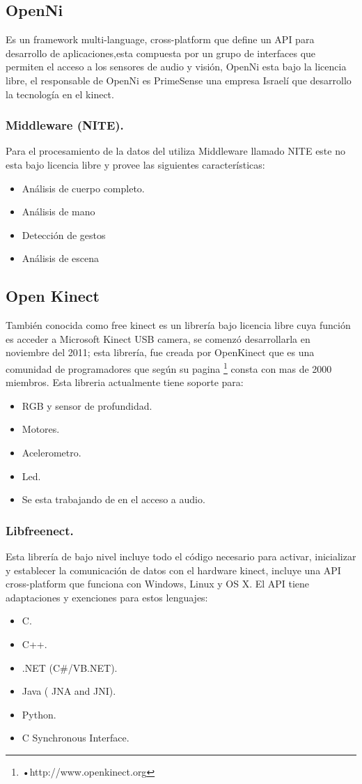 \documentclass[11pt,a4paper]{article}
\begin{document}
\subsection{OpenNi}
Es un framework multi-language, cross-platform que define un API para desarrollo de aplicaciones,esta compuesta por un grupo de interfaces que permiten el acceso a los sensores de audio y visión, OpenNi esta bajo la licencia libre, el responsable de OpenNi es PrimeSense una empresa Israelí que desarrollo la tecnología en el kinect.

\subsubsection{Middleware (NITE).}
Para el procesamiento de la datos del utiliza Middleware llamado NITE este no esta bajo licencia libre y provee las siguientes características:
\begin{itemize}
\item Análisis de cuerpo completo.
\item Análisis de mano
\item Detección de gestos 
\item Análisis de escena 
\end{itemize} 

\subsection{Open Kinect}
También conocida como free kinect es un librería bajo licencia libre cuya función es acceder a Microsoft Kinect USB camera, se comenzó desarrollarla en noviembre del 2011; esta librería, fue creada por OpenKinect que es una comunidad de programadores que según su pagina \footnote{•http://www.openkinect.org} consta con mas de 2000 miembros. Esta libreria actualmente tiene soporte para:
\begin{itemize}
\item RGB y sensor de profundidad.
\item Motores.
\item Acelerometro.
\item Led.
\item Se esta trabajando de en el acceso a audio.
\end{itemize}
\subsubsection{Libfreenect.}
Esta librería de bajo nivel incluye todo el código necesario para activar, inicializar y establecer la comunicación de datos con el hardware kinect, incluye una API cross-platform que funciona con Windows, Linux  y OS X. El API tiene adaptaciones y exenciones para estos lenguajes:
\begin{itemize}
\item C.
\item C++.
\item .NET (C\#/VB.NET).
\item Java ( JNA and JNI).
\item Python.
\item C Synchronous Interface.
\end{itemize} 
\end{document}
